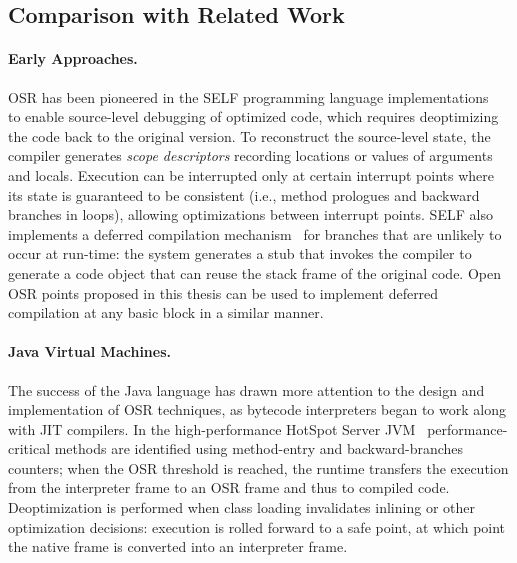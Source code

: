 

\subsection{Comparison with Related Work}
\label{ss:osr-llvm-related}

\paragraph*{Early Approaches.} OSR has been pioneered in the SELF programming language implementations~\cite{Holzle92} to enable source-level debugging of optimized code, which requires deoptimizing the code back to the original version. To reconstruct the source-level state, the compiler generates {\em scope descriptors} recording locations or values of arguments and locals. Execution can be interrupted only at certain interrupt points where its state is guaranteed to be consistent (i.e., method prologues and backward branches in loops), allowing optimizations between interrupt points. SELF also implements a deferred compilation mechanism~\cite{Chambers91} for branches that are unlikely to occur at run-time: the system generates a stub that invokes the compiler to generate a code object that can reuse the stack frame of the original code. Open OSR points proposed in this thesis can be used to implement deferred compilation at any basic block in a similar manner.

\paragraph*{Java Virtual Machines.} The success of the Java language has drawn more attention to the design and implementation of OSR techniques, as bytecode interpreters began to work along with JIT compilers. In the high-performance HotSpot Server JVM~\cite{Paleczny01} performance-critical methods are identified using method-entry and backward-branches counters; when the OSR threshold is reached, the runtime transfers the execution from the interpreter frame to an OSR frame and thus to compiled code. Deoptimization is performed when class loading invalidates inlining or other optimization decisions: execution is rolled forward to a safe point, at which point the native frame is converted into an interpreter frame.

